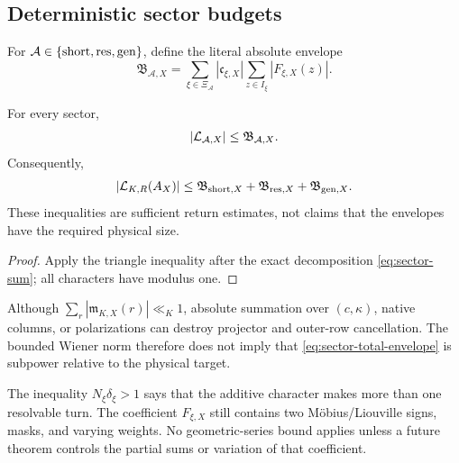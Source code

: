 \subsection{Deterministic sector budgets}

For \(\mathcal A\in\{\mathrm{short},\mathrm{res},\mathrm{gen}\}\), define the literal
absolute envelope
\begin{equation}
 \mathfrak B_{\mathcal A,X}
 =
 \sum_{\xi\in\Xi_{\mathcal A}}
 |\mathfrak c_{\xi,X}|
 \sum_{z\in I_\xi}|F_{\xi,X}(z)|.
\label{eq:sector-absolute-envelope}
\end{equation}

\begin{proposition}
\label{prop:sector-safe-return}
For every sector,
\begin{equation}
 |\mathcal L_{\mathcal A,X}|
 \le\mathfrak B_{\mathcal A,X}.
\label{eq:sector-trivial-bound}
\end{equation}
Consequently,
\begin{equation}
 |\mathcal L_{K,R}(A_X)|
 \le
 \mathfrak B_{\mathrm{short},X}
 +\mathfrak B_{\mathrm{res},X}
 +\mathfrak B_{\mathrm{gen},X}.
\label{eq:sector-total-envelope}
\end{equation}
These inequalities are sufficient return estimates, not claims that
the envelopes have the required physical size.
\end{proposition}

\begin{proof}
Apply the triangle inequality after the exact decomposition
\eqref{eq:sector-sum}; all characters have modulus one.
\end{proof}

\begin{remark}
Although
\(\sum_r|\mathfrak m_{K,X}(r)|\ll_K1\), absolute summation over
\((c,\kappa)\), native columns, or polarizations can destroy
projector and outer-row cancellation.  The bounded Wiener norm
therefore does not imply that
\eqref{eq:sector-total-envelope} is subpower relative to the
physical target.
\end{remark}

\begin{remark}
The inequality \(N_\xi\delta_\xi>1\) says that the additive character
makes more than one resolvable turn.  The coefficient
\(F_{\xi,X}\) still contains two M\"obius/Liouville signs, masks, and
varying weights.  No geometric-series bound applies unless a future
theorem controls the partial sums or variation of that coefficient.
\end{remark}
